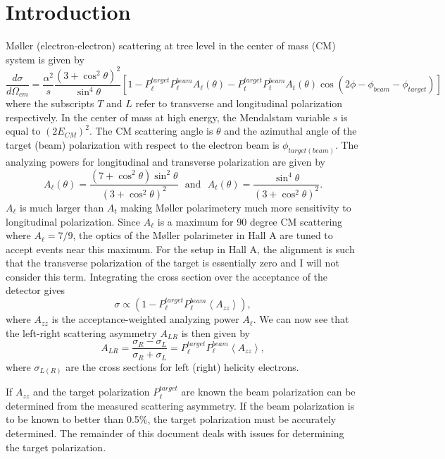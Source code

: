 \documentclass[12pt]{article}
\begin{document}
\section{Introduction}
M\o ller (electron-electron) scattering at tree level in the center of mass (CM) system is given by
\begin{equation}
\frac{d\sigma}{d\Omega_{cm}}=\frac{\alpha^2}{s}\frac{\left(3+\cos^2\theta\right)^2}{\sin^4\theta}\left[1-P^{target}_{\ell}P^{beam}_{\ell}A_{\ell}(\theta)-P^{target}_tP^{beam}_tA_t(\theta)\cos\left(2\phi-\phi_{beam}-\phi_{target}\right)\right]
\label{eq:moller_cx}
\end{equation} 
where the subscripts $T$ and $L$ refer to transverse and longitudinal polarization respectively. In the center of mass at high energy, the Mendalstam variable $s$ is equal to $(2E_{CM})^2$. The CM scattering angle is $\theta$ and the azimuthal angle of the target (beam) polarization with respect to the electron beam is $\phi_{target(beam)}$. The analyzing powers for longitudinal and transverse polarization are given by
\begin{equation}
A_{\ell}(\theta)=\frac{\left(7+\cos^2\theta\right)\sin^2\theta}{\left(3+\cos^2\theta\right)^2}~~~\textrm{and}~~~A_t(\theta)=\frac{\sin^4\theta}{\left(3+\cos^2\theta\right)^2}.
\label{eq:analyzing_pow}
\end{equation}
$A_{\ell}$ is much larger than $A_t$ making M\o ller polarimetery much more sensitivity to longitudinal polarization. Since $A_{\ell}$ is a maximum for 90 degree CM scattering where $A_{\ell}=7/9$, the optics of the M\o ller polarimeter in Hall A are tuned to accept events near this maximum. For the setup in Hall A, the alignment is such that the transverse polarization of the target is essentially zero and I will not consider this term. Integrating the cross section over the acceptance of the detector gives 
\[
\sigma \propto\left(1-P^{target}_{\ell}P^{beam}_{\ell}\left<A_{zz}\right>\right),
\]
where $A_{zz}$ is the acceptance-weighted analyzing power $A_{\ell}$. We can now see that the left-right scattering asymmetry $A_{LR}$ is then given by 
\begin{equation}
A_{LR}=\frac{\sigma_R-\sigma_L}{\sigma_R+\sigma_L}=P^{target}_{\ell}P^{beam}_{\ell}\left<A_{zz}\right>,
\label{eq:A_LR}
\end{equation}
where $\sigma_{L(R)}$ are the cross sections for left (right) helicity electrons.

If $A_{zz}$ and the target polarization $P_{\ell}^{target}$ are known the beam polarization can be determined from the measured scattering asymmetry. If the beam polarization is to be known to better than 0.5\%, the target polarization must be accurately determined. The remainder of this document deals with issues for determining the target polarization.
\end{document}
